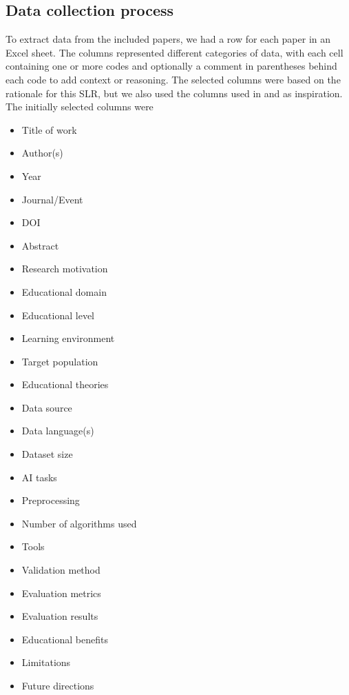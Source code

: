 \subsection{Data collection process}
To extract data from the included papers, we had a row for each paper in an Excel sheet. The columns represented different categories of data, with each cell containing one or more codes and optionally a comment in parentheses behind each code to add context or reasoning. The selected columns were based on the rationale for this SLR, but we also used the columns used in \cite{autoassessmentlitrev} and \cite{textmininglitrev} as inspiration. The initially selected columns were

\begin{itemize}
    \item Title of work
    \item Author(s)
    \item Year
    \item Journal/Event
    \item DOI
    \item Abstract
    \item Research motivation
    \item Educational domain
    \item Educational level
    \item Learning environment
    \item Target population
    \item Educational theories
    \item Data source
    \item Data language(s)
    \item Dataset size
    \item AI tasks
    \item Preprocessing
    \item Number of algorithms used
    \item Tools
    \item Validation method
    \item Evaluation metrics
    \item Evaluation results
    \item Educational benefits
    \item Limitations
    \item Future directions
\end{itemize}


